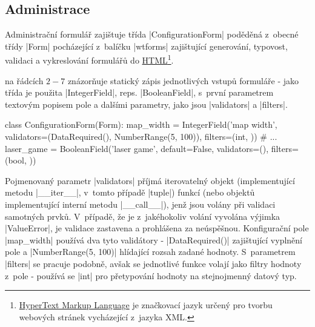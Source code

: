 \subsection{Administrace}
\label{subsec:administration}

\begin{sloppypar}
    Administrační formulář zajištuje třída \ic|ConfigurationForm| poděděná z~obecné třídy \ic|Form| pocházející z~balíčku \ic|wtforms| zajištující generování, typovost, validaci a vykreslování formulářů do \href{https://cs.wikipedia.org/wiki/HyperText_Markup_Language}{HTML}\footnote{\href{https://cs.wikipedia.org/wiki/HyperText_Markup_Language}{HyperText Markup Language} je značkovací jazyk určený pro tvorbu webových stránek vycházející z~jazyka XML.}.

     na řádcích $2-7$ znázorňuje statický zápis jednotlivých vstupů formuláře - jako třída je použita \ic|IntegerField|, reps. \ic|BooleanField|, s~první parametrem textovým popisem pole a dalšími parametry, jako jsou \ic|validators| a \ic|filters|.
\end{sloppypar}

\begin{code}[caption={Ukázka deklarace polí konfiguračního formuláře},label={lst:conf-form-fields}]
class ConfigurationForm(Form):
    map_width = IntegerField('map width',
        validators=(DataRequired(), NumberRange(5, 100)),
        filters=(int, ))
    # ...
    laser_game = BooleanField('laser game',
        default=False, validators=(),
        filters=(bool, ))
\end{code}

\begin{sloppypar}
    Pojmenovaný parametr \ic|validators| příjmá iterovatelný objekt (implementující metodu \ic|__iter__|, v~tomto případě \ic|tuple|) funkcí (nebo objektů implementující interní metodu \ic|__call__|), jenž jsou volány při validaci samotných prvků. V~případě, že je z~jakéhokoliv volání vyvolána výjimka \ic|ValueError|, je validace zastavena a prohlášena za neúspěšnou. Konfigurační pole \ic|map_width| používá dva tyto validátory - \ic|DataRequired()| zajištující vyplnění pole a \ic|NumberRange(5, 100)| hlídající rozsah zadané hodnoty. S~parametrem \ic|filters| se pracuje podobně, avšak se jednotlivé funkce volají jako filtry hodnoty z~pole - používá se \ic|int| pro přetypování hodnoty na stejnojmenný datový typ.
\end{sloppypar}

